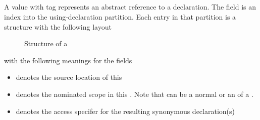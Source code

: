 

\subsection{}
\label{sec:ifc:DirSort:DeclUse}

A  value with tag  represents an abstract reference to a  declaration.
The  field is an index into the using-declaration partition.
Each entry in that partition is a structure with the following layout
%
\begin{figure}[H]
    \centering
    \caption{Structure of a }
    \label{fig:ifc:DirSort:DeclUse}
\end{figure}
%
with the following meanings for the fields
\begin{itemize}
    \item {} denotes the source location of this 
    \item {} denotes the nominated scope in this .  Note that  can be a normal  or an  of a .
    \item {} denotes the access specifer for the resulting synonymous declaration(s)
\end{itemize}



\subsection{}
\label{sec:ifc:DirSort:Expr}

